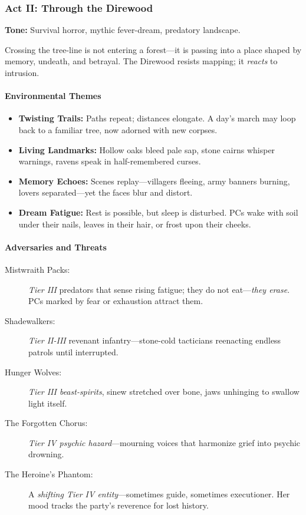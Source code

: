 \documentclass[11pt]{article}
\begin{document}
\subsubsection*{Act II: Through the Direwood}

\textbf{Tone:} Survival horror, mythic fever-dream, predatory landscape.

Crossing the tree-line is not entering a forest---it is passing into a place shaped by memory, undeath, and betrayal. The Direwood resists mapping; it \emph{reacts} to intrusion.

\paragraph{Environmental Themes}
\begin{itemize}
  \item \textbf{Twisting Trails:} Paths repeat; distances elongate. A day's march may loop back to a familiar tree, now adorned with new corpses.
  \item \textbf{Living Landmarks:} Hollow oaks bleed pale sap, stone cairns whisper warnings, ravens speak in half-remembered curses.
  \item \textbf{Memory Echoes:} Scenes replay---villagers fleeing, army banners burning, lovers separated---yet the faces blur and distort.
  \item \textbf{Dream Fatigue:} Rest is possible, but sleep is disturbed. PCs wake with soil under their nails, leaves in their hair, or frost upon their cheeks.
\end{itemize}

\paragraph{Adversaries and Threats}
\begin{description}
  \item[Mistwraith Packs:] \emph{Tier III} predators that sense rising fatigue; they do not eat---\emph{they erase}.  
    PCs marked by fear or exhaustion attract them.
  \item[Shadewalkers:] \emph{Tier II-III} revenant infantry---stone-cold tacticians reenacting endless patrols until interrupted.
  \item[Hunger Wolves:] \emph{Tier III beast-spirits}, sinew stretched over bone, jaws unhinging to swallow light itself.
  \item[The Forgotten Chorus:] \emph{Tier IV psychic hazard}---mourning voices that harmonize grief into psychic drowning.
  \item[The Heroine's Phantom:] A \emph{shifting Tier IV entity}---sometimes guide, sometimes executioner. Her mood tracks the party's reverence for lost history.
\end{description}
\end{document}
